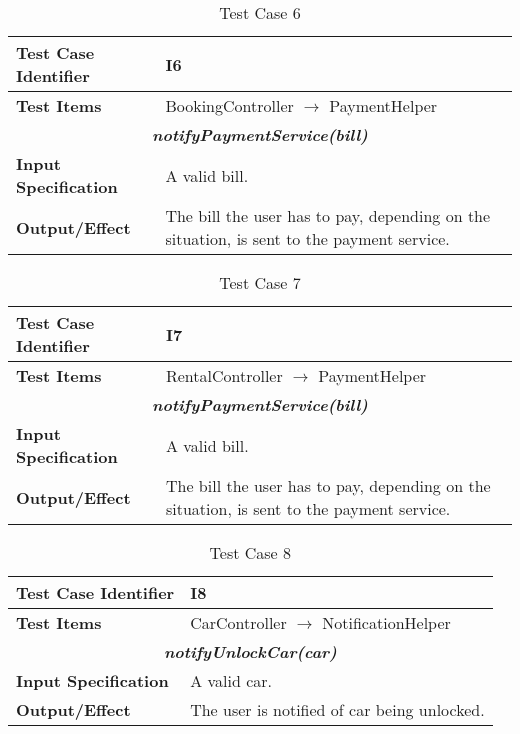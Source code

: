 \begin{table}[H]
	\begin{tabularx}{\textwidth}{l X}
		\hline
		\textbf{Test Case Identifier}	&	I6\\	\hline
		\textbf{Test Items}			&	BookingController $\rightarrow$ PaymentHelper \\	\hline\hline
		\multicolumn{2}{c}{\textbf{\textit{notifyPaymentService(bill)}}}	\\	\hline
			\textbf{Input Specification}	&	A valid bill.\\	\hline
			\textbf{Output/Effect}	&	The bill the user has to pay, depending on the situation, is sent to the payment service.\\	\hline
	\end{tabularx}
	\captionsetup{textformat=empty,labelformat=blank}
	\caption{Test Case 6}
	\label{table:template-table-6}
\end{table}

\begin{table}[H]
	\begin{tabularx}{\textwidth}{l X}
		\hline
		\textbf{Test Case Identifier}	&	I7\\	\hline
		\textbf{Test Items}			&	RentalController $\rightarrow$ PaymentHelper \\	\hline\hline
		\multicolumn{2}{c}{\textbf{\textit{notifyPaymentService(bill)}}}	\\	\hline
			\textbf{Input Specification}	&	A valid bill.\\	\hline
			\textbf{Output/Effect}	&	The bill the user has to pay, depending on the situation, is sent to the payment service.\\	\hline
	\end{tabularx}
	\captionsetup{textformat=empty,labelformat=blank}
	\caption{Test Case 7}
	\label{table:template-table-7}
\end{table}

\begin{table}[H]
	\begin{tabularx}{\textwidth}{l X}
		\hline
		\textbf{Test Case Identifier}	&	I8\\	\hline
		\textbf{Test Items}			&	CarController $\rightarrow$ NotificationHelper \\	\hline\hline
		\multicolumn{2}{c}{\textbf{\textit{notifyUnlockCar(car)}}}	\\	\hline
			\textbf{Input Specification}	&	A valid car.\\	\hline
			\textbf{Output/Effect}	&	The user is notified of car being unlocked.\\	\hline
	\end{tabularx}
	\captionsetup{textformat=empty,labelformat=blank}
	\caption{Test Case 8}
	\label{table:template-table-8}
\end{table}

